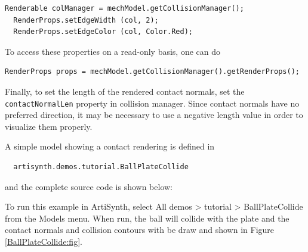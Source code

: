 \begin{lstlisting}[]
  Renderable colManager = mechModel.getCollisionManager();
  RenderProps.setEdgeWidth (col, 2);
  RenderProps.setEdgeColor (col, Color.Red);
\end{lstlisting}

To access these properties on a read-only basis, one can do
  
\begin{lstlisting}[]
  RenderProps props = mechModel.getCollisionManager().getRenderProps();
\end{lstlisting}

Finally, to set the length of the rendered contact normals, set the
{\tt contactNormalLen} property in collision manager. Since contact
normals have no preferred direction, it may be necessary to use a
negative length value in order to visualize them properly.

A simple model showing a contact rendering is defined in
%
\begin{verbatim}
  artisynth.demos.tutorial.BallPlateCollide
\end{verbatim}
%
and the complete source code is shown below:
%
\lstset{numbers=left}

\lstset{numbers=none}

To run this example in ArtiSynth, select {\sf All demos > tutorial >
BallPlateCollide} from the {\sf Models} menu. When run, the ball
will collide with the plate and the contact normals and collision 
contours with be draw and shown in Figure \ref{BallPlateCollide:fig}.

